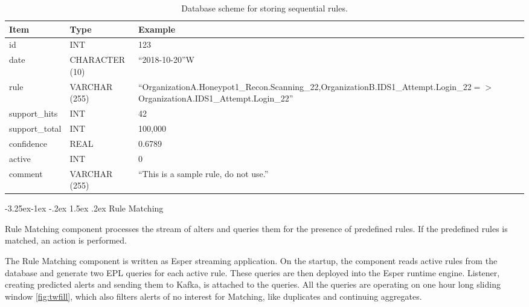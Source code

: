 \documentclass[a4paper]{article} %
\makeatletter
\renewcommand\subsection{\@startsection{subsection}{2}{\z@}%
                   {-3.25ex\@plus -1ex \@minus -.2ex}%
                   {1.5ex \@plus .2ex}%
                   {\normalfont\sffamily\large\bfseries\color{projectcolor}}}
\makeatother
\begin{document}
\begin{table}[h]
\centering
\caption{Database scheme for storing sequential rules.}
\label{tab:aida_db}
\begin{tabular}{| l | l | m{9cm} |}
\hline
\rowcolor{gray!15}\textbf{Item} & \textbf{Type} & \textbf{Example} \\
\hline \hline
id             & INT            & 123        \\ \hline
date           & CHARACTER (10) & ``2018-10-20''W \\ \hline
rule           & VARCHAR (255)  & ``OrganizationA.Honeypot1\_Recon.Scanning\_22,\newline OrganizationB.IDS1\_Attempt.Login\_22\newline $=>$ OrganizationA.IDS1\_Attempt.Login\_22'' \\ \hline
support\_hits  & INT            & 42      \\ \hline
support\_total & INT            & 100,000 \\ \hline
confidence     & REAL           & 0.6789  \\ \hline
active         & INT            & 0       \\ \hline
comment        & VARCHAR (255)  & ``This is a sample rule, do not use.'' \\ \hline
\end{tabular}
\end{table}


\subsection{Rule Matching}

Rule Matching component processes the stream of alters and queries them for the presence of predefined rules. If the predefined rules is matched, an action is performed.

The Rule Matching component is written as Esper streaming application. On the startup, the component reads active rules from the database and generate two EPL queries for each active rule. These queries are then deployed into the Esper runtime engine. Listener, creating predicted alerts and sending them to Kafka, is attached to the queries. All the queries are operating on one hour long sliding window \autoref{fig:twfill}, which also filters alerts of no interest for Matching, like duplicates and continuing aggregates.
\end{document}
